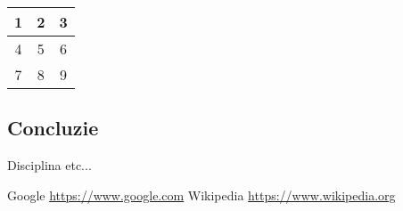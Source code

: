 \documentclass{article}
\begin{document}
\begin{tabular}{|c|c|c|}
    \hline
    1 & 2 & 3 \\
    \hline
    4 & 5 & 6 \\
    \hline
    7 & 8 & 9 \\
    \hline
\end{tabular}

\subsection{Concluzie}
Disciplina etc...

\begin{thebibliography}{9}
     Google \url{https://www.google.com}
     Wikipedia \url{https://www.wikipedia.org}
\end{thebibliography}
\end{document}
